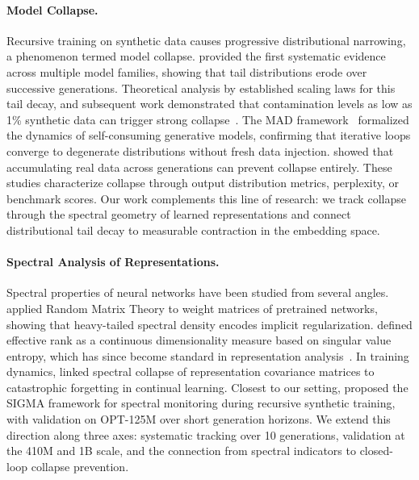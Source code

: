 
\paragraph{Model Collapse.}
Recursive training on synthetic data causes progressive distributional narrowing, a phenomenon termed model collapse.
\citet{shumailov2024collapse} provided the first systematic evidence across multiple model families, showing that tail distributions erode over successive generations.
Theoretical analysis by \citet{dohmatob2024tails} established scaling laws for this tail decay, and subsequent work demonstrated that contamination levels as low as 1\% synthetic data can trigger strong collapse~\cite{dohmatob2025strong}.
The MAD framework~\cite{alemohammad2024mad} formalized the dynamics of self-consuming generative models, confirming that iterative loops converge to degenerate distributions without fresh data injection.
\citet{gerstgrasser2024inevitable} showed that accumulating real data across generations can prevent collapse entirely.
These studies characterize collapse through output distribution metrics, perplexity, or benchmark scores.
Our work complements this line of research: we track collapse through the spectral geometry of learned representations and connect distributional tail decay to measurable contraction in the embedding space.

\paragraph{Spectral Analysis of Representations.}
Spectral properties of neural networks have been studied from several angles.
\citet{martin2021implicit} applied Random Matrix Theory to weight matrices of pretrained networks, showing that heavy-tailed spectral density encodes implicit regularization.
\citet{roy2007effectiverank} defined effective rank as a continuous dimensionality measure based on singular value entropy, which has since become standard in representation analysis~\cite{rankme2023}.
In training dynamics, \citet{he2025spectral} linked spectral collapse of representation covariance matrices to catastrophic forgetting in continual learning.
Closest to our setting, \citet{gu2026sigma} proposed the SIGMA framework for spectral monitoring during recursive synthetic training, with validation on OPT-125M over short generation horizons.
We extend this direction along three axes: systematic tracking over 10 generations, validation at the 410M and 1B scale, and the connection from spectral indicators to closed-loop collapse prevention.

